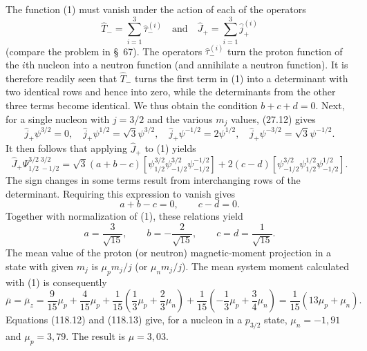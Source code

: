 The function (1) must vanish under the action of each of the operators
\[
 \hat T_- =\sum_{i=1}^3\hat\tau_-^{(i)}
 \quad\text{and}\quad
 \hat J_+=\sum_{i=1}^3\hat j_+^{(i)}
\]
(compare the problem in \S~67). The operators $\hat\tau_-^{(i)}$ turn the
proton function of the $i$th nucleon into a neutron function (and annihilate a
neutron function). It is therefore readily seen that $\hat T_-$ turns the
first term in (1) into a determinant with two identical rows and hence into
zero, while the determinants from the other three terms become identical. We
thus obtain the condition $b+c+d=0$. Next, for a single nucleon with $j=3/2$
and the various $m_j$ values, (27.12) gives
\[
 \hat j_+\psi^{3/2}=0,\quad
 \hat j_+\psi^{1/2}=\sqrt3\psi^{3/2},\quad
 \hat j_+\psi^{-1/2}=2\psi^{1/2},\quad
 \hat j_+\psi^{-3/2}=\sqrt3\psi^{-1/2}.
\]
It then follows that applying $\hat J_+$ to (1) yields
\[
 \hat J_+\Psi^{3/2\;3/2}_{1/2\;-1/2}
 =\sqrt3(a+b-c)
 [\psi^{3/2}_{1/2}\psi^{3/2}_{-1/2}\psi^{-1/2}_{-1/2}]
 +2(c-d)[\psi^{3/2}_{-1/2}\psi^{1/2}_{1/2}\psi^{1/2}_{-1/2}].
\]
The sign changes in some terms result from interchanging rows of the
determinant. Requiring this expression to vanish gives
\[
 a+b-c=0,\qquad c-d=0.
\]
Together with normalization of (1), these relations yield
\[
 a=\frac3{\sqrt{15}},\qquad b=-\frac2{\sqrt{15}},\qquad
 c=d=\frac1{\sqrt{15}}.
\]
The mean value of the proton (or neutron) magnetic-moment projection in a
state with given $m_j$ is $\mu_pm_j/j$ (or $\mu_nm_j/j$). The mean system
moment calculated with (1) is consequently
\[
 \overline\mu=\overline\mu_z
 =\frac9{15}\mu_p+\frac4{15}\mu_p
 +\frac1{15}\left(\frac13\mu_p+\frac23\mu_n\right)
 +\frac1{15}\left(-\frac13\mu_p+\frac34\mu_n\right)
 =\frac1{15}(13\mu_p+\mu_n).
\]
Equations (118.12) and (118.13) give, for a nucleon in a $p_{3/2}$ state,
$\mu_n=-1{,}91$ and $\mu_p=3{,}79$. The result is $\mu=3{,}03$.
